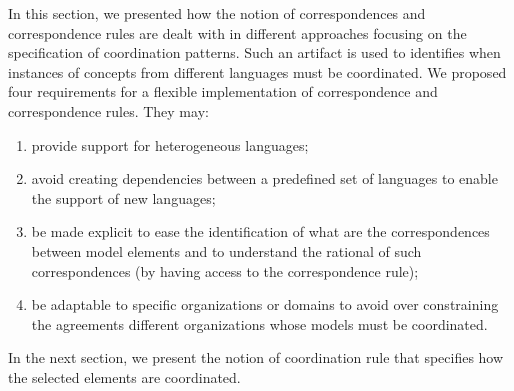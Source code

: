 
In this section, we presented how the notion of correspondences and correspondence rules are dealt with in different approaches focusing on the specification of coordination patterns. Such an artifact is used to identifies when instances of concepts from different languages must be coordinated. 
We proposed four requirements for a flexible implementation of correspondence and correspondence rules. They may: 
\begin{enumerate}
\item provide support for heterogeneous languages;
\item avoid creating dependencies between a predefined set of languages to enable the support of new languages;
\item be made explicit to ease the identification of what are the correspondences between model elements and to understand the rational of such correspondences (by having access to the correspondence rule);
\item be adaptable to specific organizations or domains to avoid over constraining the agreements different organizations whose models must be coordinated.
\end{enumerate}

In the next section, we present the notion of coordination rule that specifies how the selected elements are coordinated.      
							
				